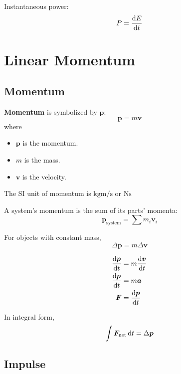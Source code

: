 \documentclass[a4paper, titlepage]{book}
\begin{document}
Instantaneous power:
\begin{equation}
    P = \odv{E}{t}
\end{equation}


\chapter{Linear Momentum}

\section{Momentum}

\textbf{Momentum} is symbolized by \(\bm{p}\):
\begin{equation}
    \bm{p} = m \bm{v}
\end{equation}
where
\begin{itemize}
    \item \(\bm{p}\) is the momentum.
    \item \(m\) is the mass.
    \item \(\bm{v}\) is the velocity.
\end{itemize}

The SI unit of momentum is \(\unit{\kilogram \metre \per \second}\)
or \(\unit{\newton \second}\)

A system's momentum is the sum of its parts' momenta:
\begin{equation}
    \bm{p}_\mathrm{system} = \sum m_i \bm{v}_i
\end{equation}

For objects with constant mass,
\begin{equation}
    \Delta{\bm{p}} = m \Delta{\bm{v}}
\end{equation}

\begin{equation} \label{eq:force-momentum}
    \begin{aligned}
        \odv{\bm{p}}{t} &= m \odv{\bm{v}}{t} \\
        \odv{\bm{p}}{t} &= m \bm{a} \\
        \bm{F} &= \odv{\bm{p}}{t}
    \end{aligned}
\end{equation}

In integral form,
\begin{equation}
    \int \bm{F}_\mathrm{net} \odif{t} = \Delta{\bm{p}}
\end{equation}

\section{Impulse}
\end{document}
